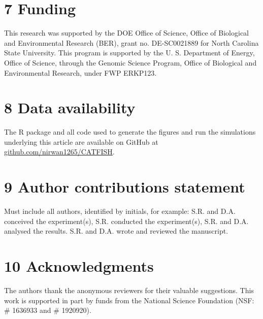 \documentclass[unnumsec,webpdf,contemporary,large]{oup-authoring-template}%
\theoremstyle{thmstyleone}%
\theoremstyle{thmstyletwo}%
\theoremstyle{thmstylethree}%
\begin{document}
\section{7 Funding}
This research was supported by the DOE Office of Science, Office of Biological and Environmental Research (BER), grant no. DE-SC0021889 for North Carolina State University. This program is supported by the U. S. Department of Energy, Office of Science, through the Genomic Science Program, Office of Biological and Environmental Research, under FWP ERKP123.

\section{8 Data availability}

The R package and all code used to generate the figures and run the simulations underlying this article are available on GitHub at \href{https://github.com/nirwan1265/CATFISH}{github.com/nirwan1265/CATFISH}.

\section{9 Author contributions statement}

Must include all authors, identified by initials, for example:
S.R. and D.A. conceived the experiment(s),  S.R. conducted the experiment(s), S.R. and D.A. analysed the results.  S.R. and D.A. wrote and reviewed the manuscript.

\section{10 Acknowledgments}
The authors thank the anonymous reviewers for their valuable suggestions. This work is supported in part by funds from the National Science Foundation (NSF: \# 1636933 and \# 1920920).






\clearpage
\newpage
\end{document}
